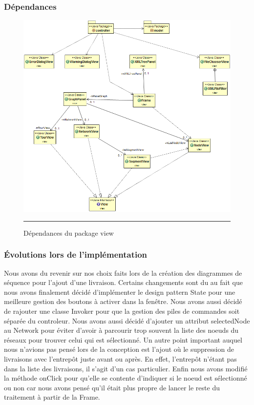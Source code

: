 \subsubsection{Dépendances}

\begin{figure}[H]
	\centering
		\includegraphics[width=\textwidth,height=\textheight,keepaspectratio]{Figures/retro_view_dep}
		\rule{35em}{0.5pt}
	\caption[Dépendances du package view]{Dépendances du package view}
\end{figure}

\subsubsection{Évolutions lors de l'implémentation}
Nous avons du revenir sur nos choix faits lors de la création des diagrammes de séquence pour l’ajout d’une livraison. Certains changements sont du au fait que nous avons finalement décidé d’implémenter le design pattern State pour une meilleure gestion des boutons à activer dans la fenêtre. Nous avons aussi décidé de rajouter une classe Invoker pour que la gestion des piles de commandes soit séparée du controleur. Nous avons aussi décidé d’ajouter un attribut selectedNode au Network pour éviter d’avoir à parcourir trop souvent la liste des noeuds du 
réseaux pour trouver celui qui est sélectionné. Un autre point important auquel nous n’avions pas pensé lors de la conception est l’ajout où le suppression de livraisons avec l’entrepôt juste avant ou après. En effet, l’entrepôt n’étant pas dans la liste des livraisons, il s’agit d’un cas particulier. Enfin nous avons modifié la méthode onClick pour qu’elle se contente d’indiquer si le noeud est sélectionné ou non car nous avons pensé qu’il était plus propre de lancer le reste du traitement à partir de la Frame.

